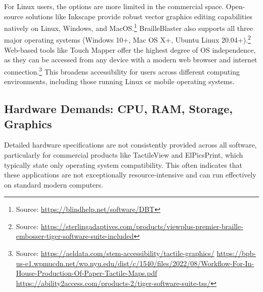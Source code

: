 For Linux users, the options are more limited in the commercial space. Open-source solutions like Inkscape provide robust vector graphics editing capabilities natively on Linux, Windows, and MacOS.\footnote{Source:  \url{https://blindhelp.net/software/DBT}} BrailleBlaster also supports all three major operating systems (Windows 10+, Mac OS X+, Ubuntu Linux 20.04+).\footnote{Source:  \url{https://sterlingadaptives.com/products/viewplus-premier-braille-embosser-tiger-software-suite-included}} Web-based tools like Touch Mapper offer the highest degree of OS independence, as they can be accessed from any device with a modern web browser and internet connection.\footnote{Source:  \url{https://aeldata.com/stem-accessibility/tactile-graphics/} \url{https://bpb-us-e1.wpmucdn.net/wp.nyu.edu/dist/c/1540/files/2022/08/Workflow-For-In-House-Production-Of-Paper-Tactile-Maps.pdf} \url{https://ability2access.com/products-2/tiger-software-suite-tss/}} This broadens accessibility for users across different computing environments, including those running Linux or mobile operating systems.

\subsection{Hardware Demands: CPU, RAM, Storage, Graphics}

Detailed hardware specifications are not consistently provided across all software, particularly for commercial products like TactileView and ElPicsPrint, which typically state only operating system compatibility. This often indicates that these applications are not exceptionally resource-intensive and can run effectively on standard modern computers.

